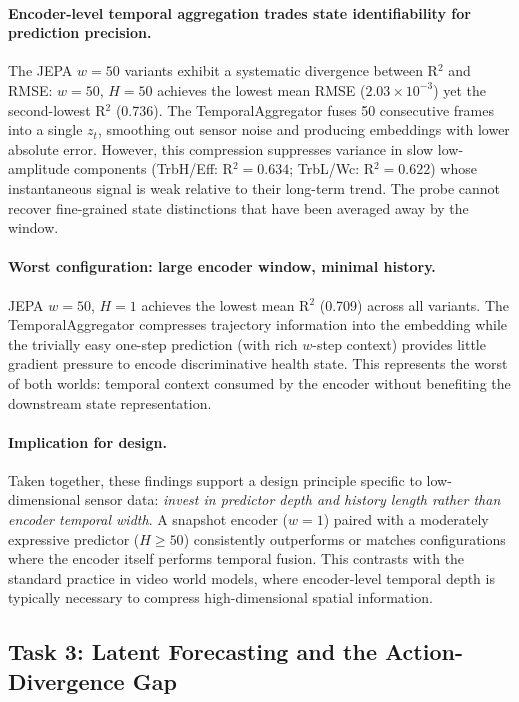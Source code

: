 \paragraph{Encoder-level temporal aggregation trades state identifiability
for prediction precision.}
The JEPA $w{=}50$ variants exhibit a systematic divergence between R$^2$ and
RMSE: $w{=}50$, $H{=}50$ achieves the lowest mean RMSE ($2.03{\times}10^{-3}$)
yet the second-lowest R$^2$ (0.736).  The TemporalAggregator fuses 50
consecutive frames into a single $z_t$, smoothing out sensor noise and
producing embeddings with lower absolute error.  However, this compression
suppresses variance in slow low-amplitude components
(TrbH/Eff: R$^2{=}0.634$; TrbL/Wc: R$^2{=}0.622$) whose instantaneous
signal is weak relative to their long-term trend.  The probe cannot recover
fine-grained state distinctions that have been averaged away by the window.

\paragraph{Worst configuration: large encoder window, minimal history.}
JEPA $w{=}50$, $H{=}1$ achieves the lowest mean R$^2$ (0.709) across all
variants.  The TemporalAggregator compresses trajectory information into the
embedding while the trivially easy one-step prediction (with rich $w$-step
context) provides little gradient pressure to encode discriminative health
state.  This represents the worst of both worlds: temporal context consumed
by the encoder without benefiting the downstream state representation.

\paragraph{Implication for design.}
Taken together, these findings support a design principle specific to
low-dimensional sensor data: \emph{invest in predictor depth and history
length rather than encoder temporal width}.  A snapshot encoder ($w{=}1$)
paired with a moderately expressive predictor ($H{\geq}50$) consistently
outperforms or matches configurations where the encoder itself performs
temporal fusion.  This contrasts with the standard practice in video world
models, where encoder-level temporal depth is typically necessary to compress
high-dimensional spatial information.


\subsection{Task 3: Latent Forecasting and the Action-Divergence Gap}
\label{sec:task3}

